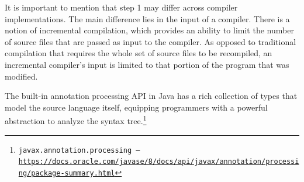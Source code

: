 It is important to mention that step 1 may differ across compiler implementations. The main difference lies in the input of a compiler. There is a notion of incremental compilation, which provides an ability to limit the number of source files that are passed as input to the compiler. As opposed to traditional compilation that requires the whole set of source files to be recompiled, an incremental compiler’s input is limited to that portion of the program that was modified.

\n

The built-in annotation processing API in Java has a rich collection of types that model the source language itself, equipping programmers with a powerful abstraction to analyze the syntax tree.\footnote{\texttt{javax.annotation.processing -- \url{https://docs.oracle.com/javase/8/docs/api/javax/annotation/processing/package-summary.html}}}
